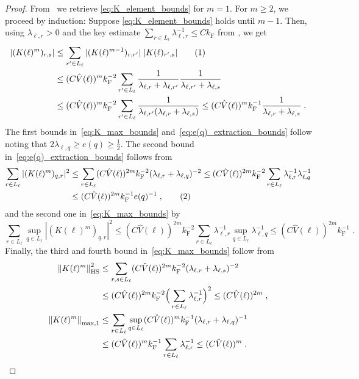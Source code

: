 \documentclass[12pt,a4paper]{article}
\numberwithin{equation}{section}
\newcommand{\1}{\mathbb{I}}
\newcommand{\F}{\mathrm{F}}
\newcommand{\HS}{\mathrm{HS}}
\newcommand{\tagg}[1]{ \stepcounter{equation} \tag{\theequation}
\label{#1} } %
\newcommand{\half}{\frac{1}{2}}
\newcommand{\normmaxi}[1]{\norm{#1}_{\mathrm{max,1}}}
\theoremstyle{plain}
\theoremstyle{definition}
\theoremstyle{remark}
\theoremstyle{plain}
\theoremstyle{definition}
\theoremstyle{remark}
\begin{document}
\begin{proof}
From~\cite[Prop.~7.10]{CHN23} we retrieve \eqref{eq:K_element_bounds} for $ m = 1 $. For $ m \ge 2 $, we proceed by induction: Suppose \eqref{eq:K_element_bounds} holds until $ m-1 $. Then, using $ \lambda_{\ell,r} > 0 $ and the key estimate $ \sum_{r \in L_\ell} \lambda_{\ell,r}^{-1} \le C k_{\F} $ from \cite[Prop.~A.2]{CHN21}, we get
\begin{align*}
		|(K(\ell)^m)_{r,s}|
		&\le \sum_{r' \in L_\ell}
		|(K(\ell)^{m-1})_{r,r'}| \;
		|K(\ell)_{r',s}| \tagg{eq:notimportant1} \\
			& \le (C \hat{V}(\ell))^m k_{\F}^{-2} \sum_{r' \in L_\ell}
		\frac{1}{\lambda_{\ell, r} + \lambda_{\ell, r'}}
		\frac{1}{\lambda_{\ell, r'} + \lambda_{\ell, s}} \\
		&\le (C \hat{V}(\ell))^m k_{\F}^{-2} \sum_{r' \in L_\ell}
		\frac{1}{\lambda_{\ell, r'} (\lambda_{\ell, r} + \lambda_{\ell, s})}
		\le (C \hat{V}(\ell))^m k_{\F}^{-1}
		\frac{1}{\lambda_{\ell, r} + \lambda_{\ell, s}} \;.
\end{align*}
The first bounds in~\eqref{eq:K_max_bounds} and~\eqref{eq:e(q)_extraction_bounds} follow  noting that $ 2 \lambda_{\ell,q} \ge e(q) \ge \half $. The second bound in~\eqref{eq:e(q)_extraction_bounds} follows from
\begin{align*}
	\sum_{r \in L_\ell} |(K(\ell)^m)_{q,r}|^2
	&\le \sum_{r \in L_\ell} (C \hat{V}(\ell))^{2m} k_{\F}^{-2} (\lambda_{\ell,r} + \lambda_{\ell,q})^{-2}
	\le (C \hat{V}(\ell))^{2m} k_{\F}^{-2} \sum_{r \in L_\ell} \lambda_{\ell,r}^{-1} \lambda_{\ell,q}^{-1} \\
	&\le (C \hat{V}(\ell))^{2m} k_{\F}^{-1} e(q)^{-1} \;, \tagg{eq:notimportant}
\end{align*}
and the second one in~\eqref{eq:K_max_bounds} by
\begin{equation*}
	\sum_{r \in L_\ell} \sup_{q \in L_\ell} |(K(\ell)^m)_{q,r}|^2
	\le (C \hat{V}(\ell))^{2m} k_{\F}^{-2} \sum_{r \in L_\ell} \lambda_{\ell,r}^{-1} 
		\sup_{q \in L_\ell} \lambda_{\ell,q}^{-1}
	\le (C \hat{V}(\ell))^{2m} k_{\F}^{-1} \;.
\end{equation*}
Finally, the third and fourth bound in~\eqref{eq:K_max_bounds} follow from
\begin{align}
	\norm{K(\ell)^m}_{\HS}^2
	&\le \sum_{r,s \in L_\ell} (C \hat{V}(\ell))^{2m} k_{\F}^{-2} (\lambda_{\ell,r} + \lambda_{\ell,s})^{-2} \nonumber\\
	&	\le (C \hat{V}(\ell))^{2m} k_{\F}^{-2} \Big( \sum_{r \in L_\ell} \lambda_{\ell,r}^{-1} \Big)^2
	\le (C \hat{V}(\ell))^{2m} \;, \nonumber\\
	\normmaxi{K(\ell)^m} 
	&\leq \sum_{r \in L_\ell} \sup_{q \in L_\ell} (C \hat{V}(\ell))^{m} k_{\F}^{-1} (\lambda_{\ell,r} + \lambda_{\ell,q})^{-1} \nonumber\\
	& \le (C \hat{V}(\ell))^{m} k_{\F}^{-1} \sum_{r \in L_\ell} \lambda_{\ell,r}^{-1} \leq (C \hat{V}(\ell))^{m} \;.\nonumber	\qedhere
\end{align}
\end{proof}
\end{document}
